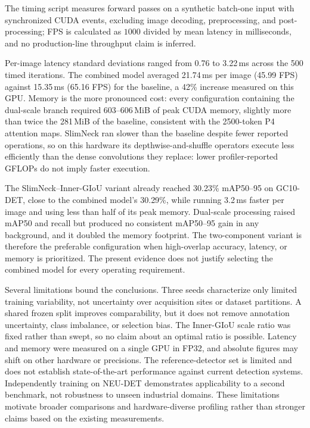 \documentclass[pdflatex,sn-mathphys-num,iicol]{sn-jnl}
\begin{document}
The timing script measures forward passes on a synthetic batch-one input with synchronized CUDA events, excluding image decoding, preprocessing, and post-processing; FPS is calculated as $1000$ divided by mean latency in milliseconds, and no production-line throughput claim is inferred.

Per-image latency standard deviations ranged from 0.76 to 3.22\,ms across the 500 timed iterations. The combined model averaged 21.74\,ms per image (45.99 FPS) against 15.35\,ms (65.16 FPS) for the baseline, a 42\% increase measured on this GPU. Memory is the more pronounced cost: every configuration containing the dual-scale branch required 603--606\,MiB of peak CUDA memory, slightly more than twice the 281\,MiB of the baseline, consistent with the 2500-token P4 attention maps. SlimNeck ran slower than the baseline despite fewer reported operations, so on this hardware its depthwise-and-shuffle operators execute less efficiently than the dense convolutions they replace: lower profiler-reported GFLOPs do not imply faster execution.

The SlimNeck--Inner-GIoU variant already reached 30.23\% mAP50--95 on GC10-DET, close to the combined model's 30.29\%, while running 3.2\,ms faster per image and using less than half of its peak memory. Dual-scale processing raised mAP50 and recall but produced no consistent mAP50--95 gain in any background, and it doubled the memory footprint. The two-component variant is therefore the preferable configuration when high-overlap accuracy, latency, or memory is prioritized. The present evidence does not justify selecting the combined model for every operating requirement.

Several limitations bound the conclusions. Three seeds characterize only limited training variability, not uncertainty over acquisition sites or dataset partitions. A shared frozen split improves comparability, but it does not remove annotation uncertainty, class imbalance, or selection bias. The Inner-GIoU scale ratio was fixed rather than swept, so no claim about an optimal ratio is possible. Latency and memory were measured on a single GPU in FP32, and absolute figures may shift on other hardware or precisions. The reference-detector set is limited and does not establish state-of-the-art performance against current detection systems. Independently training on NEU-DET demonstrates applicability to a second benchmark, not robustness to unseen industrial domains. These limitations motivate broader comparisons and hardware-diverse profiling rather than stronger claims based on the existing measurements.
\end{document}
